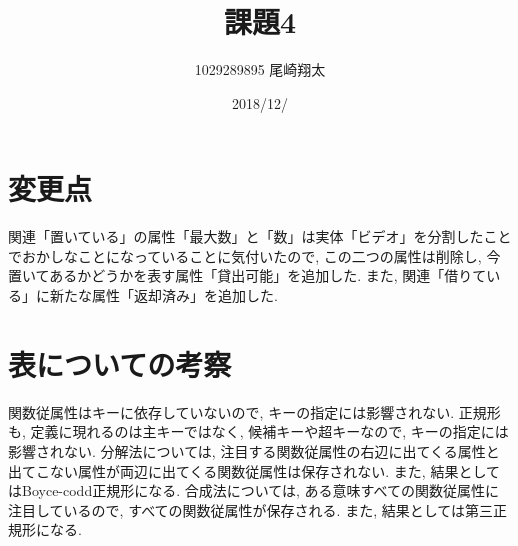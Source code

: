\documentclass{jarticle}
\begin{document}
\title{課題4}
\author{1029289895 尾崎翔太}
\date{2018/12/}

\maketitle
\newpage

\section{変更点}
関連「置いている」の属性「最大数」と「数」は実体「ビデオ」を分割したことでおかしなことになっていることに気付いたので, この二つの属性は削除し, 今置いてあるかどうかを表す属性「貸出可能」を追加した. また, 関連「借りている」に新たな属性「返却済み」を追加した.

\section{表についての考察}
関数従属性はキーに依存していないので, キーの指定には影響されない. 正規形も, 定義に現れるのは主キーではなく, 候補キーや超キーなので, キーの指定には影響されない. 分解法については, 注目する関数従属性の右辺に出てくる属性と出てこない属性が両辺に出てくる関数従属性は保存されない. また, 結果としてはBoyce-codd正規形になる. 合成法については, ある意味すべての関数従属性に注目しているので, すべての関数従属性が保存される. また, 結果としては第三正規形になる.
\end{document}
